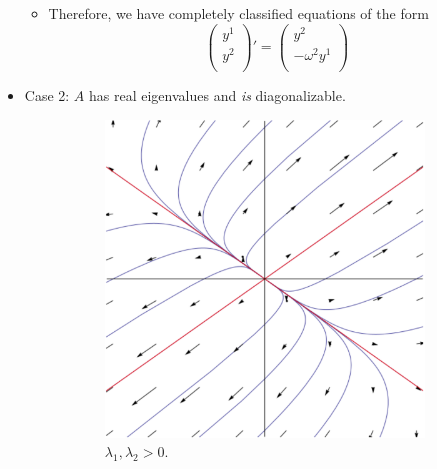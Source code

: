 \documentclass[../notes.tex]{subfiles}
\begin{document}
\begin{itemize}
\begin{itemize}
        \item Therefore, we have completely classified equations of the form
        \begin{equation*}
            \begin{pmatrix}
                y^1\\
                y^2\\
            \end{pmatrix}'
            =
            \begin{pmatrix}
                y^2\\
                -\omega^2y^1\\
            \end{pmatrix}
        \end{equation*}
    \end{itemize}
    \item Case 2: $A$ has real eigenvalues and \emph{is} diagonalizable.
    \begin{figure}[h!]
        \centering
        \begin{subfigure}[b]{0.32\linewidth}
            \centering
            \includegraphics[width=0.8\linewidth]{../ExtFiles/planarRealDiaga.png}
            \caption{$\lambda_1,\lambda_2>0$.}
            \label{fig:planarRealDiaga}
        \end{subfigure}
        \begin{subfigure}[b]{0.32\linewidth}
            \centering

\end{subfigure}
\end{figure}
\end{itemize}
\end{document}
